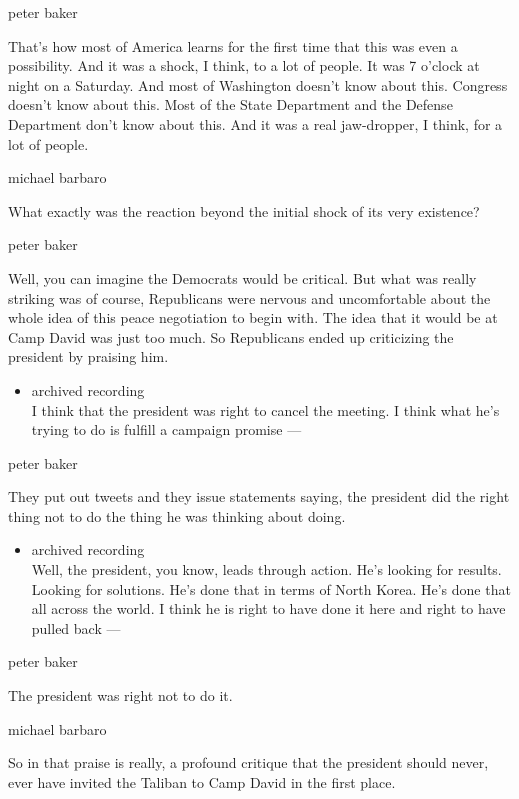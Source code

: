 peter baker

That's how most of America learns for the first time that this was even
a possibility. And it was a shock, I think, to a lot of people. It was 7
o'clock at night on a Saturday. And most of Washington doesn't know
about this. Congress doesn't know about this. Most of the State
Department and the Defense Department don't know about this. And it was
a real jaw-dropper, I think, for a lot of people.

michael barbaro

What exactly was the reaction beyond the initial shock of its very
existence?

peter baker

Well, you can imagine the Democrats would be critical. But what was
really striking was of course, Republicans were nervous and
uncomfortable about the whole idea of this peace negotiation to begin
with. The idea that it would be at Camp David was just too much. So
Republicans ended up criticizing the president by praising him.

\begin{itemize}
\tightlist
\item
  archived recording\\
  I think that the president was right to cancel the meeting. I think
  what he's trying to do is fulfill a campaign promise ---
\end{itemize}

peter baker

They put out tweets and they issue statements saying, the president did
the right thing not to do the thing he was thinking about doing.

\begin{itemize}
\tightlist
\item
  archived recording\\
  Well, the president, you know, leads through action. He's looking for
  results. Looking for solutions. He's done that in terms of North
  Korea. He's done that all across the world. I think he is right to
  have done it here and right to have pulled back ---
\end{itemize}

peter baker

The president was right not to do it.

michael barbaro

So in that praise is really, a profound critique that the president
should never, ever have invited the Taliban to Camp David in the first
place.


